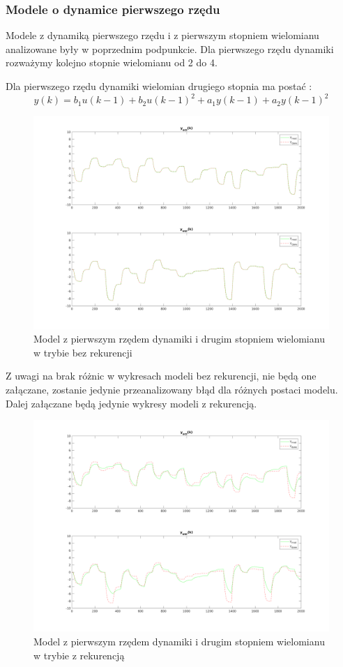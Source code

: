 \documentclass[a4paper, 11pt]{article}
\begin{document}
\subsubsection{Modele o dynamice pierwszego rzędu}
Modele z dynamiką pierwszego rzędu i z pierwszym stopniem wielomianu analizowane były w poprzednim podpunkcie. Dla pierwszego rzędu dynamiki rozważymy kolejno stopnie wielomianu od 2 do 4. 

Dla pierwszego rzędu dynamiki wielomian drugiego stopnia ma postać : 
$$y(k) = b_1u(k-1)+b_2u(k-1)^2 + a_1y(k-1)+ a_2y(k-1)^2$$
\begin{figure}[H]
\centering
\includegraphics[scale=0.50]{dane_dyn_mod_brek_D_1N_2.png}
\caption{Model z pierwszym rzędem dynamiki i drugim stopniem wielomianu w trybie bez rekurencji }
\label{}
\end{figure}

Z uwagi na brak różnic w wykresach modeli bez rekurencji, nie będą one załączane, zostanie jedynie przeanalizowany błąd dla różnych postaci modelu. Dalej załączane będą jedynie wykresy modeli z rekurencją. 
\begin{figure}[H]
\centering
\includegraphics[scale=0.50]{dane_dyn_mod_rek_D_1N_2.png}
\caption{Model z pierwszym rzędem dynamiki i drugim stopniem wielomianu w trybie z rekurencją }
\label{}
\end{figure}
\end{document}
